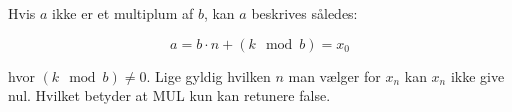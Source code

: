 \documentclass[12pt, a4paper, hidelinks]{article}
\begin{document}
Hvis $a$ ikke er et multiplum af $b$, kan $a$ beskrives således:

\begin{equation}
a = b \cdot n + (k \mod b) = x_0
\end{equation}

hvor $(k \mod b) \neq 0$. Lige gyldig hvilken $n$ man vælger for $x_n$ kan $x_n$ ikke give nul. Hvilket betyder at MUL kun kan retunere false.


















\end{document}
